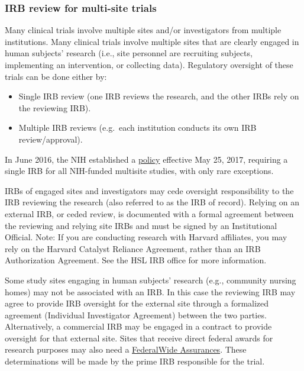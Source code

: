 \documentclass[]{book}
\providecommand{\tightlist}{%
  \setlength{\itemsep}{0pt}\setlength{\parskip}{0pt}}
\theoremstyle{definition}
\theoremstyle{definition}
\theoremstyle{definition}
\theoremstyle{remark}
\begin{document}
\subsubsection{IRB review for multi-site
trials}\label{irb-review-for-multi-site-trials}

Many clinical trials involve multiple sites and/or investigators from
multiple institutions. Many clinical trials involve multiple sites that
are clearly engaged in human subjects' research (i.e., site personnel
are recruiting subjects, implementing an intervention, or collecting
data). Regulatory oversight of these trials can be done either by:

\begin{itemize}
\tightlist
\item
  Single IRB review (one IRB reviews the research, and the other IRBs
  rely on the reviewing IRB).
\item
  Multiple IRB reviews (e.g.~each institution conducts its own IRB
  review/approval).
\end{itemize}

In June 2016, the NIH established a
\href{http://grants.nih.gov/grants/guide/notice-files/NOT-OD-16-094.html}{policy}
effective May 25, 2017, requiring a single IRB for all NIH-funded
multisite studies, with only rare exceptions.

IRBs of engaged sites and investigators may cede oversight
responsibility to the IRB reviewing the research (also referred to as
the IRB of record). Relying on an external IRB, or ceded review, is
documented with a formal agreement between the reviewing and relying
site IRBs and must be signed by an Institutional Official. Note: If you
are conducting research with Harvard affiliates, you may rely on the
Harvard Catalyst Reliance Agreement, rather than an IRB Authorization
Agreement. See the HSL IRB office for more information.

Some study sites engaging in human subjects' research (e.g., community
nursing homes) may not be associated with an IRB. In this case the
reviewing IRB may agree to provide IRB oversight for the external site
through a formalized agreement (Individual Investigator Agreement)
between the two parties. Alternatively, a commercial IRB may be engaged
in a contract to provide oversight for that external site. Sites that
receive direct federal awards for research purposes may also need a
\href{http://www.hhs.gov/ohrp/register-irbs-and-obtain-fwas/fwas/fwa-protection-of-human-subjecct/index.html}{FederalWide
Assurances}. These determinations will be made by the prime IRB
responsible for the trial.
\end{document}
